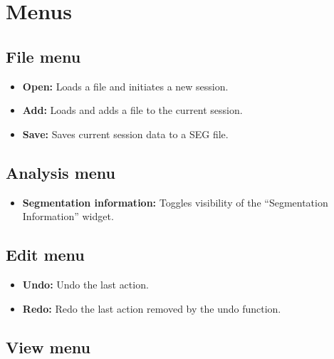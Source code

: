 \section{Menus}
\subsection{File menu}

\begin{itemize}
\item \textbf{Open:} Loads a file and initiates a new \espina{} session.
\item \textbf{Add:} Loads and adds a file to the current session.
\item \textbf{Save:} Saves current session data to a SEG file.
\end{itemize}

\subsection{Analysis menu}

\begin{itemize}
\item \textbf{Segmentation information:} Toggles visibility of the ``Segmentation Information'' widget.
\end{itemize}

\subsection{Edit menu}

\begin{itemize}
\item \textbf{Undo:} Undo the last action.
\item \textbf{Redo:} Redo the last action removed by the undo function.
\end{itemize}

\subsection{View menu}

